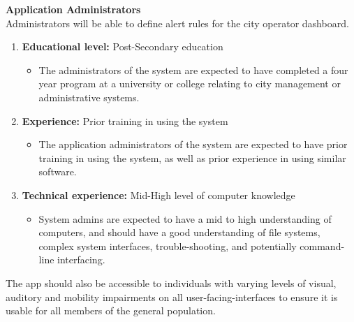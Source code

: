 \documentclass[]{article}
\begin{document}
\textbf{Application Administrators}\\
Administrators will be able to define alert rules for the city operator dashboard.
\begin{enumerate}
	\item \textbf{Educational level:} Post-Secondary education
		\begin{itemize}
			\item The administrators of the system are expected to have completed a four year program at a university or college relating to city management or administrative systems. 
		\end{itemize}
	\item \textbf{Experience:} Prior training in using the system
		\begin{itemize}
			\item The application administrators of the system are expected to have prior training in using the system, as well as prior experience in using similar software.
		\end{itemize}
	\item \textbf{Technical experience:} Mid-High level of computer knowledge
		\begin{itemize}
			\item System admins are expected to have a mid to high understanding of computers, and should have a good understanding of file systems, complex system interfaces, trouble-shooting, and potentially command-line interfacing.
		\end{itemize}
\end{enumerate}
The app should also be accessible to individuals with varying levels of visual, auditory and mobility impairments on all user-facing-interfaces to ensure it is usable for all members of the general population. 
\end{document}
